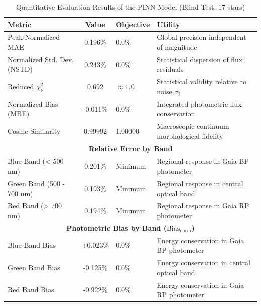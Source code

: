 
\begin{table}[htpb]
\centering
\caption{Quantitative Evaluation Results of the PINN Model (Blind Test: 17 stars)}
\label{tab:pinn_evaluation}
\begin{tabular}{lcll}
\hline
\textbf{Metric} & \textbf{Value} & \textbf{Objective} & \textbf{Utility} \\
\hline
Peak-Normalized MAE & 0.196\% & 0.0\% & Global precision independent of magnitude \\
Normalized Std. Dev. (NSTD) & 0.243\% & 0.0\% & Statistical dispersion of flux residuals \\
Reduced $\chi^2_\nu$ & 0.692 & $\approx 1.0$ & Statistical validity relative to noise $\sigma_i$ \\
Normalized Bias (MBE) & -0.011\% & 0.0\% & Integrated photometric flux conservation \\
Cosine Similarity & 0.99992 & 1.00000 & Macroscopic continuum morphological fidelity \\
\hline
\multicolumn{4}{c}{\textbf{Relative Error by Band}} \\
\hline
Blue Band (< 500 nm) & 0.201\% & Minimum & Regional response in Gaia BP photometer \\
Green Band (500 - 700 nm) & 0.193\% & Minimum & Regional response in central optical band \\
Red Band (> 700 nm) & 0.194\% & Minimum & Regional response in Gaia RP photometer \\
\hline
\multicolumn{4}{c}{\textbf{Photometric Bias by Band ($\text{Bias}_{\text{norm}}$)}} \\
\hline
Blue Band Bias & +0.023\% & 0.0\% & Energy conservation in Gaia BP photometer \\
Green Band Bias & -0.125\% & 0.0\% & Energy conservation in central optical band \\
Red Band Bias & -0.922\% & 0.0\% & Energy conservation in Gaia RP photometer \\
\hline
\end{tabular}
\end{table}
